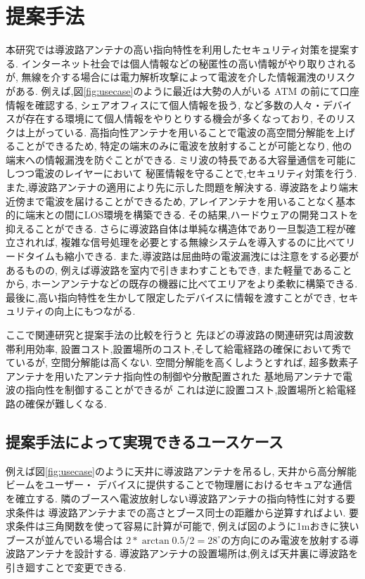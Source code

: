 \documentclass[technicalreport]{ieicej}
\begin{document}
\section{提案手法}

本研究では導波路アンテナの高い指向特性を利用したセキュリティ対策を提案する.
インターネット社会では個人情報などの秘匿性の高い情報がやり取りされるが,
無線を介する場合には電力解析攻撃によって電波を介した情報漏洩のリスクがある.
例えば,図\ref{fig:usecase}のように最近は大勢の人がいる ATM の前にて口座情報を確認する,
シェアオフィスにて個人情報を扱う,
など多数の人々・デバイスが存在する環境にて個人情報をやりとりする機会が多くなっており,
そのリスクは上がっている.
高指向性アンテナを用いることで電波の高空間分解能を上げることができるため,
特定の端末のみに電波を放射することが可能となり,
他の端末への情報漏洩を防ぐことができる.
ミリ波の特長である大容量通信を可能にしつつ電波のレイヤーにおいて
秘匿情報を守ることで,セキュリティ対策を行う.
また,導波路アンテナの適用により先に示した問題を解決する.
導波路をより端末近傍まで電波を届けることができるため,
アレイアンテナを用いることなく基本的に端末との間にLOS環境を構築できる.
その結果,ハードウェアの開発コストを抑えることができる.
さらに導波路自体は単純な構造体であり一旦製造工程が確立されれば,
複雑な信号処理を必要とする無線システムを導入するのに比べてリードタイムも縮小できる.
また,導波路は屈曲時の電波漏洩には注意をする必要があるものの,
例えば導波路を室内で引きまわすこともでき,
また軽量であることから,
ホーンアンテナなどの既存の機器に比べてエリアをより柔軟に構築できる.
最後に,高い指向特性を生かして限定したデバイスに情報を渡すことができ,
セキュリティの向上にもつながる.

ここで関連研究と提案手法の比較を行うと
先ほどの導波路の関連研究は周波数帯利用効率,
設置コスト,設置場所のコスト,そして給電経路の確保において秀でているが,
空間分解能は高くない.
空間分解能を高くしようとすれば,
超多数素子アンテナを用いたアンテナ指向性の制御や分散配置された
基地局アンテナで電波の指向性を制御することができるが
これは逆に設置コスト,設置場所と給電経路の確保が難しくなる.

\subsection{提案手法によって実現できるユースケース}

例えば図\ref{fig:usecase}のように天井に導波路アンテナを吊るし,
天井から高分解能ビームをユーザー・
デバイスに提供することで物理層におけるセキュアな通信を確立する.
隣のブースへ電波放射しない導波路アンテナの指向特性に対する要求条件は
導波路アンテナまでの高さとブース同士の距離から逆算すればよい.
要求条件は三角関数を使って容易に計算が可能で,
例えば図のように1mおきに狭いブースが並んでいる場合は
$2 * \arctan 0.5 / 2 = 28^{\circ}$の方向にのみ電波を放射する導波路アンテナを設計する.
導波路アンテナの設置場所は,例えば天井裏に導波路を引き廻すことで変更できる.
\end{document}
